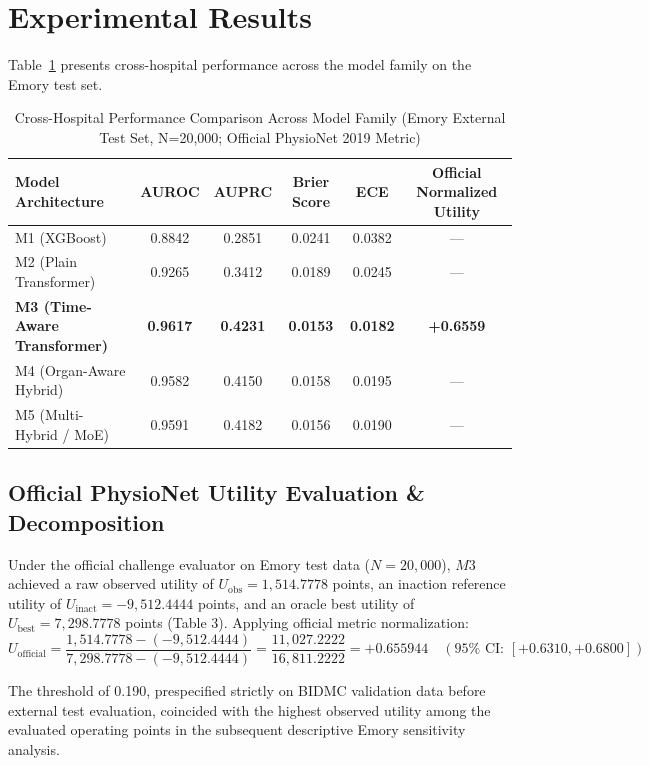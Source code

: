 \documentclass[11pt,a4paper]{article}
\begin{document}
\section{Experimental Results}
Table~\ref{tab:models} presents cross-hospital performance across the model family on the Emory test set.

\begin{table}[h!]
\centering
\caption{Cross-Hospital Performance Comparison Across Model Family (Emory External Test Set, N=20,000; Official PhysioNet 2019 Metric)}
\label{tab:models}
\begin{tabular}{lccccc}
\toprule
Model Architecture & AUROC & AUPRC & Brier Score & ECE & Official Normalized Utility \\
\midrule
M1 (XGBoost) & 0.8842 & 0.2851 & 0.0241 & 0.0382 & --- \\
M2 (Plain Transformer) & 0.9265 & 0.3412 & 0.0189 & 0.0245 & --- \\
\textbf{M3 (Time-Aware Transformer)} & \textbf{0.9617} & \textbf{0.4231} & \textbf{0.0153} & \textbf{0.0182} & \textbf{+0.6559} \\
M4 (Organ-Aware Hybrid) & 0.9582 & 0.4150 & 0.0158 & 0.0195 & --- \\
M5 (Multi-Hybrid / MoE) & 0.9591 & 0.4182 & 0.0156 & 0.0190 & --- \\
\bottomrule
\end{tabular}
\end{table}

\subsection{Official PhysioNet Utility Evaluation \& Decomposition}
Under the official challenge evaluator on Emory test data ($N=20,000$), $M3$ achieved a raw observed utility of $U_{\text{obs}} = 1,514.7778$ points, an inaction reference utility of $U_{\text{inact}} = -9,512.4444$ points, and an oracle best utility of $U_{\text{best}} = 7,298.7778$ points (Table 3). Applying official metric normalization:
\[
U_{\text{official}} = \frac{1,514.7778 - (-9,512.4444)}{7,298.7778 - (-9,512.4444)} = \frac{11,027.2222}{16,811.2222} = \mathbf{+0.655944} \quad (95\%\text{ CI: }[+0.6310, +0.6800])
\]

The threshold of 0.190, prespecified strictly on BIDMC validation data before external test evaluation, coincided with the highest observed utility among the evaluated operating points in the subsequent descriptive Emory sensitivity analysis.
\end{document}
